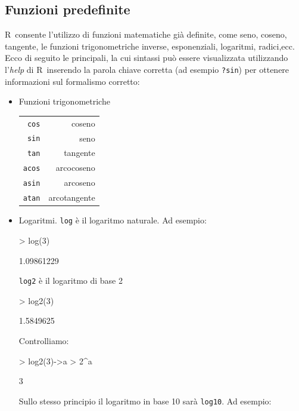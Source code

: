 \documentclass[onecolumn,11pt]{book}
\newcommand{\rpr}{\textsf{R}~}
\begin{document}
\subsection{Funzioni predefinite}
\rpr consente l'utilizzo di funzioni matematiche gi\`a definite, come seno, coseno, tangente, le funzioni trigonometriche inverse, esponenziali, logaritmi, radici,ecc.
Ecco di seguito le principali, la cui sintassi pu\`o essere visualizzata utilizzando l'\emph {help} di \rpr inserendo la parola chiave corretta (ad esempio \texttt{?sin}) per ottenere informazioni sul formalismo corretto:
\begin{itemize}
 \item{}
 Funzioni trigonometriche\hfill\vskip10pt
 \begin{tabular}{|r r |}\hline
\texttt{cos}&  coseno\\
\texttt{sin}& seno\\
\texttt{tan}&   tangente\\
\texttt{acos}&   arcocoseno\\
\texttt{asin}&   arcoseno\\
\texttt{atan} &  arcotangente\\
\hline
\end{tabular}
\item{}Logaritmi.\vskip10pt
\texttt{log} \`e il  logaritmo naturale. Ad esempio:
\begin{Schunk}
\begin{Sinput}
> log(3)
\end{Sinput}
\begin{Soutput}
[1] 1.09861229
\end{Soutput}
\end{Schunk}
\texttt{log2} \`e il logaritmo di base 2
\begin{Schunk}
\begin{Sinput}
> log2(3)
\end{Sinput}
\begin{Soutput}
[1] 1.5849625
\end{Soutput}
\end{Schunk}
Controlliamo:
\begin{Schunk}
\begin{Sinput}
> log2(3)->a
> 2^a
\end{Sinput}
\begin{Soutput}
[1] 3
\end{Soutput}
\end{Schunk}
Sullo stesso principio il logaritmo in base 10 sar\`a
\texttt{log10}. Ad
esempio:
\begin{Schunk}

\end{Schunk}
\end{itemize}
\end{document}
